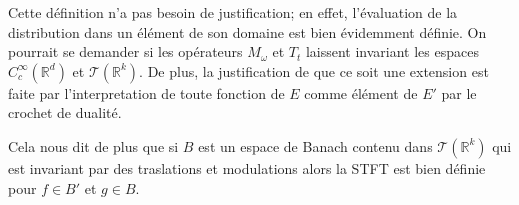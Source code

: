 	Cette définition n'a pas besoin de justification; en effet, l'évaluation de la distribution dans un élément de son domaine est bien évidemment définie. On pourrait se demander si les opérateurs $M_{\omega}$ et $T_{t}$ laissent invariant les espaces $C^{\infty}_{c}(\mathbb{R}^{d})$ et $\mathscr{T} (\mathbb{R}^k)$. De plus, la justification de que ce soit une extension est faite par l'interpretation de toute fonction de $E$ comme élément de $E'$ par le crochet de dualité.

	Cela nous dit de plus que si $B$ est un espace de Banach contenu dans $\mathscr{T} (\mathbb{R}^k)$ qui est invariant par des traslations et modulations alors la STFT est bien définie pour $f\in B'$ et $g\in B$.